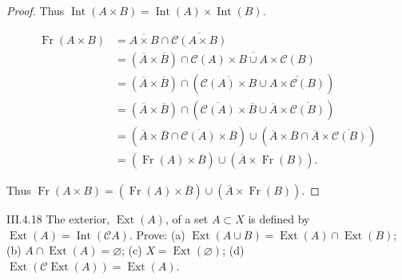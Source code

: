 \begin{proof}
    Thus \( \operatorname{Int}(A\times B) = \operatorname{Int}(A) \times \operatorname{Int}(B) \).

    \hrulefill%
    \begingroup
    \allowdisplaybreaks%
    \begin{align*}
        \operatorname{Fr}(A \times B) & = \overline{A \times B} \cap \overline{\mathscr{C}(A \times B)}                                                                                                                                              \\
                                      & = (\overline{A} \times \overline{B}) \cap \overline{\mathscr{C}(A) \times B \cup A \times \mathscr{C}(B)}                                                                                                    \\
                                      & = (\overline{A} \times \overline{B}) \cap \left( \overline{\mathscr{C}(A) \times B} \cup \overline{A\times \mathscr{C}(B)} \right)                                                                           \\
                                      & = (\overline{A} \times \overline{B}) \cap \left( \overline{\mathscr{C}(A)} \times \overline{B} \cup \overline{A} \times \overline{\mathscr{C}(B)} \right)                                                    \\
                                      & = \left( \overline{A} \times \overline{B} \cap \overline{\mathscr{C}(A)} \times \overline{B} \right) \cup \left( \overline{A} \times \overline{B} \cap \overline{A} \times \overline{\mathscr{C}(B)} \right) \\
                                      & = \left( \operatorname{Fr}(A) \times \overline{B} \right) \cup \left( \overline{A} \times \operatorname{Fr}(B) \right).
    \end{align*}
    \endgroup

    Thus \( \operatorname{Fr}(A \times B) = \left( \operatorname{Fr}(A) \times \overline{B} \right) \cup \left( \overline{A} \times \operatorname{Fr}(B) \right) \).
\end{proof}

\begin{problem}{III.4.18}
The exterior, \( \operatorname{Ext}(A) \), of a set \(A \subset X\) is defined by \( \operatorname{Ext}(A) = \operatorname{Int}(\mathscr{C}A) \). Prove: (a) \( \operatorname{Ext}(A \cup B) = \operatorname{Ext}(A) \cap \operatorname{Ext}(B) \); (b) \( A \cap \operatorname{Ext}(A) = \varnothing \); (c) \( X = \operatorname{Ext}(\varnothing) \); (d) \( \operatorname{Ext}(\mathscr{C}\operatorname{Ext}(A)) = \operatorname{Ext}(A) \).
\end{problem}

